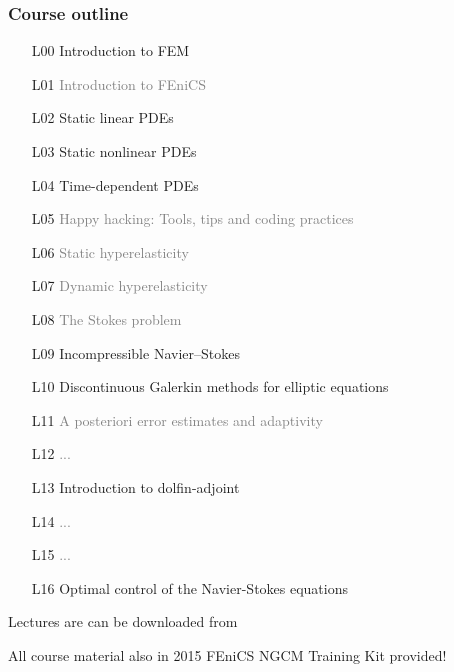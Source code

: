 \documentclass{fenicscourse}
\begin{document}

\begin{frame}
  \frametitle{Course outline}

  \tiny

  \begin{enumerate}
  \item[L00]
    Introduction to FEM
  \item[L01]
    \textcolor{grey}{Introduction to FEniCS}
  \item[L02]
    Static linear PDEs
  \item[L03]
    Static nonlinear PDEs
  \item[L04]
    Time-dependent PDEs
  \item[L05]
    \textcolor{grey}{Happy hacking: Tools, tips and coding practices}
  \item[L06]
    \textcolor{grey}{Static hyperelasticity}
  \item[L07]
    \textcolor{grey}{Dynamic hyperelasticity}
  \item[L08]
    \textcolor{grey}{The Stokes problem}
  \item[L09]
    Incompressible Navier--Stokes
  \item[L10]
    Discontinuous Galerkin methods for elliptic equations
  \item[L11]
    \textcolor{grey}{A posteriori error estimates and adaptivity}
  \item[L12]
    \textcolor{grey}{...}
  \item[L13]
    Introduction to dolfin-adjoint
  \item[L14]
    \textcolor{grey}{...}
  \item[L15]
    \textcolor{grey}{...}
  \item[L16]
    Optimal control of the Navier-Stokes equations
  \end{enumerate}

  \normalsize

  {\footnotesize Lectures are can be downloaded from
    }

  \bigskip

  {\footnotesize All course material also in 2015 FEniCS NGCM Training
    Kit provided!}

\end{frame}
\end{document}
